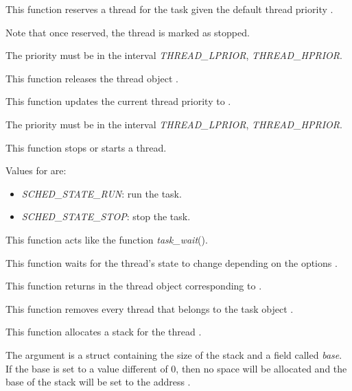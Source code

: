 {
  This function reserves a thread for the task 
  given the default thread priority .

  Note that once reserved, the thread is marked as stopped.

  The priority must be in the interval \emph{THREAD\_LPRIOR},
  \emph{THREAD\_HPRIOR}.
}

{
  This function releases the thread object .
}

{
  This function updates the current thread priority
  to .

  The priority must be in the interval \emph{THREAD\_LPRIOR},
  \emph{THREAD\_HPRIOR}.
}

{
  This function stops or starts a thread.

  Values for  are:

  \begin{itemize}
  \item
    \emph{SCHED\_STATE\_RUN}: run the task.
  \item
    \emph{SCHED\_STATE\_STOP}: stop the task.
  \end{itemize}
}

{
  This function acts like the function \emph{task\_wait}().

  This function waits for the thread's state to change depending on
  the options .

}

{
  This function returns in  the thread object
  corresponding to .
}

{
  This function removes every thread that belongs to the
  task object .
}

{
  This function allocates a stack for the thread .

  The  argument is a struct containing the
  size of the stack and a field called \emph{base}. If the
  base is set to a value different of 0, then no space will
  be allocated and the base of the stack will be set to the
  address .
}

